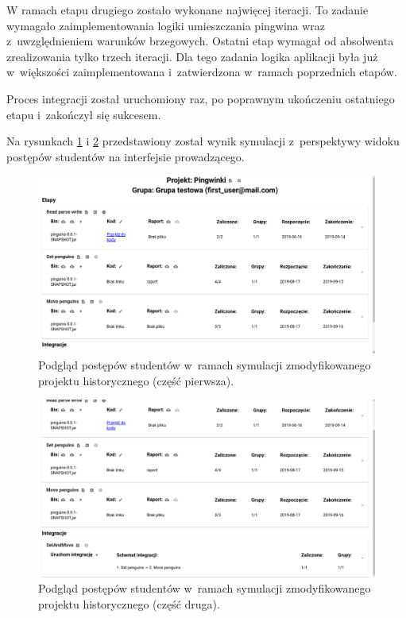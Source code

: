 W ramach etapu drugiego zostało wykonane najwięcej iteracji.
To zadanie wymagało zaimplementowania logiki umieszczania pingwina wraz z~uwzględnieniem warunków brzegowych.
Ostatni etap wymagał od absolwenta zrealizowania tylko trzech iteracji.
Dla tego zadania logika aplikacji była już w~większości zaimplementowana i~zatwierdzona w~ramach poprzednich etapów.

Proces integracji został uruchomiony raz, po poprawnym ukończeniu ostatniego etapu i~zakończył się sukcesem.

Na rysunkach \ref{fig:penguins_simulation_interface_1} i \ref{fig:penguins_simulation_interface_2} przedstawiony został wynik symulacji z~perspektywy widoku postępów studentów na interfejsie prowadzącego.

\vfill

\begin{figure}[H]
    \centering
    \includegraphics[width = 16cm]{chapter07/penguins_preview_part_1.png}
    \caption{Podgląd postępów studentów w~ramach symulacji zmodyfikowanego projektu historycznego (część pierwsza).}
    \label{fig:penguins_simulation_interface_1}
\end{figure}

\begin{figure}[H]
    \centering
    \includegraphics[width = 16cm]{chapter07/penguins_preview_part_2.png}
    \caption{Podgląd postępów studentów w~ramach symulacji zmodyfikowanego projektu historycznego (część druga).}
    \label{fig:penguins_simulation_interface_2}
\end{figure}

